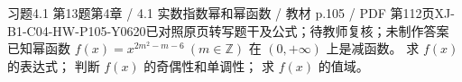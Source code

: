 \par\noindent\begin{minipage}{\linewidth}
\begin{bankitem}{习题4.1 第13题}{第4章 / 4.1 实数指数幂和幂函数 / 教材 p.105 / PDF 第112页}{XJ-B1-C04-HW-P105-Y0620}{已对照原页转写题干及公式；待教师复核；未制作答案}
已知幂函数 $f(x)=x^{2m^2-m-6}\ (m\in\mathbb Z)$ 在 $(0,+\infty)$ 上是减函数。
求 $f(x)$ 的表达式；
判断 $f(x)$ 的奇偶性和单调性；
求 $f(x)$ 的值域。
\end{bankitem}
\end{minipage}\par\medskip
